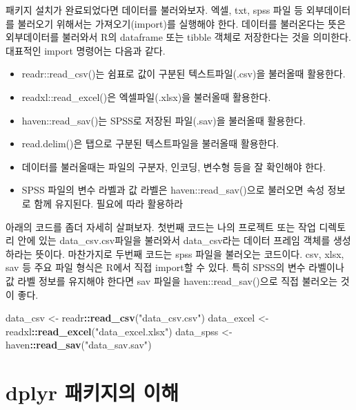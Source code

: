 \documentclass[
]{book}
\newenvironment{Shaded}{\begin{snugshade}}{\end{snugshade}}
\newcommand{\FunctionTok}[1]{\textcolor[rgb]{0.13,0.29,0.53}{\textbf{#1}}}
\newcommand{\NormalTok}[1]{#1}
\newcommand{\OtherTok}[1]{\textcolor[rgb]{0.56,0.35,0.01}{#1}}
\newcommand{\SpecialCharTok}[1]{\textcolor[rgb]{0.81,0.36,0.00}{\textbf{#1}}}
\newcommand{\StringTok}[1]{\textcolor[rgb]{0.31,0.60,0.02}{#1}}
\providecommand{\tightlist}{%
  \setlength{\itemsep}{0pt}\setlength{\parskip}{0pt}}
\begin{document}
패키지 설치가 완료되었다면 데이터를 불러와보자. 엑셀, txt, spss 파일 등 외부데이터를 불러오기 위해서는 가져오기(import)를 실행해야 한다. 데이터를 불러온다는 뜻은 외부데이터를 불러와서 R의 dataframe 또는 tibble 객체로 저장한다는 것을 의미한다. 대표적인 import 명령어는 다음과 같다.

\begin{itemize}
\tightlist
\item
  readr::read\_csv()는 쉼표로 값이 구분된 텍스트파일(.csv)을 불러올때 활용한다.
\item
  readxl::read\_excel()은 엑셀파일(.xlsx)을 불러올때 활용한다.
\item
  haven::read\_sav()는 SPSS로 저장된 파일(.sav)을 불러올때 활용한다.
\item
  read.delim()은 탭으로 구분된 텍스트파일을 불러올때 활용한다.
\item
  데이터를 불러올때는 파일의 구분자, 인코딩, 변수형 등을 잘 확인해야 한다.
\item
  SPSS 파일의 변수 라벨과 값 라벨은 haven::read\_sav()으로 불러오면 속성 정보로 함께 유지된다. 필요에 따라 활용하라
\end{itemize}

아래의 코드를 좀더 자세히 살펴보자. 첫번째 코드는 나의 프로젝트 또는 작업 디렉토리 안에 있는 data\_csv.csv파일을 불러와서 data\_csv라는 데이터 프레임 객체를 생성하라는 뜻이다. 마찬가지로 두번째 코드는 spss 파일을 불러오는 코드이다.
csv, xlsx, sav 등 주요 파일 형식은 R에서 직접 import할 수 있다. 특히 SPSS의 변수 라벨이나 값 라벨 정보를 유지해야 한다면 sav 파일을 haven::read\_sav()으로 직접 불러오는 것이 좋다.

\begin{Shaded}
\begin{Highlighting}[]
\NormalTok{data\_csv }\OtherTok{\textless{}{-}}\NormalTok{ readr}\SpecialCharTok{::}\FunctionTok{read\_csv}\NormalTok{(}\StringTok{"data\_csv.csv"}\NormalTok{)}
\NormalTok{data\_excel }\OtherTok{\textless{}{-}}\NormalTok{ readxl}\SpecialCharTok{::}\FunctionTok{read\_excel}\NormalTok{(}\StringTok{"data\_excel.xlsx"}\NormalTok{)}
\NormalTok{data\_spss }\OtherTok{\textless{}{-}}\NormalTok{ haven}\SpecialCharTok{::}\FunctionTok{read\_sav}\NormalTok{(}\StringTok{"data\_sav.sav"}\NormalTok{)}
\end{Highlighting}
\end{Shaded}

\section{dplyr 패키지의 이해}\label{dplyr-uxd328uxd0a4uxc9c0uxc758-uxc774uxd574}
\end{document}
